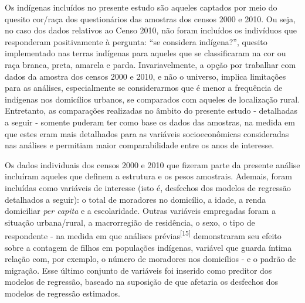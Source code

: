 \documentclass{article}
\begin{document}
Os indígenas incluídos no presente estudo são aqueles captados por meio do
quesito cor/raça dos questionários das amostras dos censos 2000 e 2010. Ou seja,
no caso dos dados relativos ao Censo 2010, não foram incluídos os indivíduos que
responderam positivamente à pergunta: “se considera indígena?”, quesito
implementado nas terras indígenas para aqueles que se classificaram na cor ou
raça branca, preta, amarela e parda. Invariavelmente, a opção por trabalhar com
dados da amostra dos censos 2000 e 2010, e não o universo, implica limitações
para as análises, especialmente se considerarmos que é menor a frequência de
indígenas nos domicílios urbanos, se comparados com aqueles de localização
rural. Entretanto, as comparações realizadas no âmbito do presente estudo -
detalhadas a seguir - somente puderam ter como base os dados das amostras, na
medida em que estes eram mais detalhados para as variáveis socioeconômicas
consideradas nas análises e permitiam maior comparabilidade entre os anos de
interesse.

Os dados individuais dos censos 2000 e 2010 que fizeram parte da presente
análise incluíram aqueles que definem a estrutura e os pesos amostrais. Ademais,
foram incluídas como variáveis de interesse (isto é, desfechos dos modelos de
regressão detalhados a seguir): o total de moradores no domicílio, a idade, a
renda domiciliar \textit{per capita}
e a escolaridade. Outras variáveis empregadas foram a situação urbana/rural, a
macrorregião de residência, o sexo, o tipo de respondente - na medida em que
análises prévias\textsuperscript{[}\textsuperscript{15}\textsuperscript{]}
demonstraram seu efeito sobre a contagem de filhos em populações indígenas,
variável que guarda íntima relação com, por exemplo, o número de moradores nos
domicílios - e o padrão de migração. Esse último conjunto de variáveis foi
inserido como preditor dos modelos de regressão, baseado na suposição de que
afetaria os desfechos dos modelos de regressão estimados.
\end{document}
